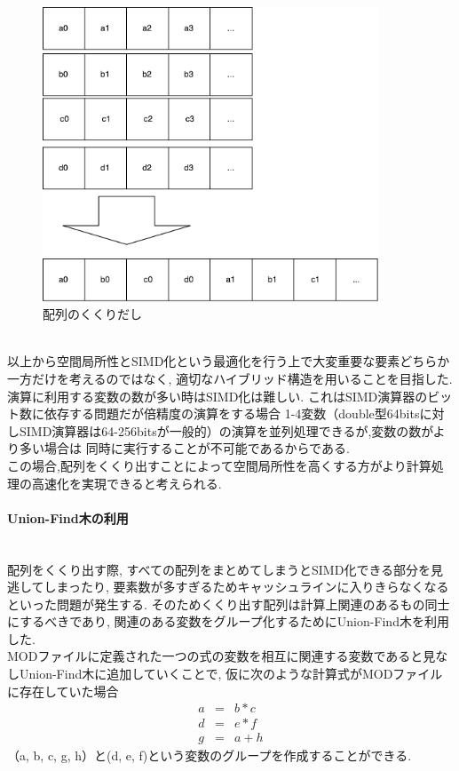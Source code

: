 \begin{figure}[htb]
  \begin{center}
    \includegraphics[width=10cm]{./images/MERGE-ARRAY.pdf}
    \caption{配列のくくりだし}
    \label{fig:merge-array}
  \end{center}
\end{figure}~\\
以上から空間局所性とSIMD化という最適化を行う上で大変重要な要素どちらか一方だけを考えるのではなく,
適切なハイブリッド構造を用いることを目指した.\\
演算に利用する変数の数が多い時はSIMD化は難しい. これはSIMD演算器のビット数に依存する問題だが倍精度の演算をする場合
1-4変数（double型64bitsに対しSIMD演算器は64-256bitsが一般的）の演算を並列処理できるが,変数の数がより多い場合は
同時に実行することが不可能であるからである.\\
この場合,配列をくくり出すことによって空間局所性を高くする方がより計算処理の高速化を実現できると考えられる.\\

\paragraph{Union-Find木の利用}~\\
配列をくくり出す際, すべての配列をまとめてしまうとSIMD化できる部分を見逃してしまったり,
要素数が多すぎるためキャッシュラインに入りきらなくなるといった問題が発生する.
そのためくくり出す配列は計算上関連のあるもの同士にするべきであり, 関連のある変数をグループ化するためにUnion-Find木を利用した.\\
MODファイルに定義された一つの式の変数を相互に関連する変数であると見なしUnion-Find木に追加していくことで, 仮に次のような計算式がMODファイルに存在していた場合
\begin{eqnarray}
  a &=& b * c\\
  d &=& e * f\\
  g &=& a + h
\label{eq:3x0}
\end{eqnarray}
（a, b, c, g, h）と(d, e, f)という変数のグループを作成することができる.\\

